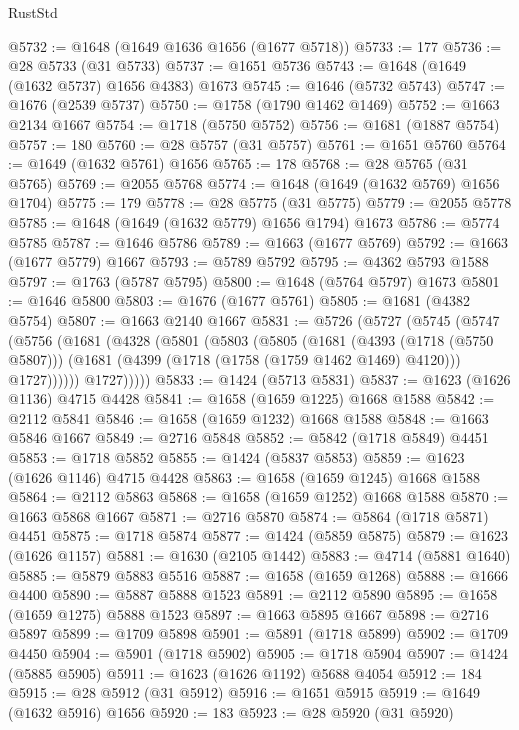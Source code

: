 \begin{lexlean}{RustStd}
\begin{coremodule}
{\begin{coremodule}
{{{{{{{{{{{{{{{{{{{{{{{{{{{{{{{{{{{{{{{{{{{{@5732 := @1648 (@1649 @1636 @1656 (@1677 @5718))
@5733 := 177
@5736 := @28 @5733 (@31 @5733)
@5737 := @1651 @5736
@5743 := @1648 (@1649 (@1632 @5737) @1656 @4383) @1673
@5745 := @1646 (@5732 @5743)
@5747 := @1676 (@2539 @5737)
@5750 := @1758 (@1790 @1462 @1469)
@5752 := @1663 @2134 @1667
@5754 := @1718 (@5750 @5752)
@5756 := @1681 (@1887 @5754)
@5757 := 180
@5760 := @28 @5757 (@31 @5757)
@5761 := @1651 @5760
@5764 := @1649 (@1632 @5761) @1656
@5765 := 178
@5768 := @28 @5765 (@31 @5765)
@5769 := @2055 @5768
@5774 := @1648 (@1649 (@1632 @5769) @1656 @1704)
@5775 := 179
@5778 := @28 @5775 (@31 @5775)
@5779 := @2055 @5778
@5785 := @1648 (@1649 (@1632 @5779) @1656 @1794) @1673
@5786 := @5774 @5785
@5787 := @1646 @5786
@5789 := @1663 (@1677 @5769)
@5792 := @1663 (@1677 @5779) @1667
@5793 := @5789 @5792
@5795 := @4362 @5793 @1588
@5797 := @1763 (@5787 @5795)
@5800 := @1648 (@5764 @5797) @1673
@5801 := @1646 @5800
@5803 := @1676 (@1677 @5761)
@5805 := @1681 (@4382 @5754)
@5807 := @1663 @2140 @1667
@5831 := @5726
    (@5727
      (@5745
        (@5747
          (@5756
            (@1681
              (@4328
                (@5801
                  (@5803
                    (@5805
                      (@1681
                        (@4393 (@1718 (@5750 @5807)))
                        (@1681 (@4399 (@1718 (@1758 (@1759 @1462 @1469) @4120))) @1727))))))
              @1727)))))
@5833 := @1424 (@5713 @5831)
@5837 := @1623 (@1626 @1136) @4715 @4428
@5841 := @1658 (@1659 @1225) @1668 @1588
@5842 := @2112 @5841
@5846 := @1658 (@1659 @1232) @1668 @1588
@5848 := @1663 @5846 @1667
@5849 := @2716 @5848
@5852 := @5842 (@1718 @5849) @4451
@5853 := @1718 @5852
@5855 := @1424 (@5837 @5853)
@5859 := @1623 (@1626 @1146) @4715 @4428
@5863 := @1658 (@1659 @1245) @1668 @1588
@5864 := @2112 @5863
@5868 := @1658 (@1659 @1252) @1668 @1588
@5870 := @1663 @5868 @1667
@5871 := @2716 @5870
@5874 := @5864 (@1718 @5871) @4451
@5875 := @1718 @5874
@5877 := @1424 (@5859 @5875)
@5879 := @1623 (@1626 @1157)
@5881 := @1630 (@2105 @1442)
@5883 := @4714 (@5881 @1640)
@5885 := @5879 @5883 @5516
@5887 := @1658 (@1659 @1268)
@5888 := @1666 @4400
@5890 := @5887 @5888 @1523
@5891 := @2112 @5890
@5895 := @1658 (@1659 @1275) @5888 @1523
@5897 := @1663 @5895 @1667
@5898 := @2716 @5897
@5899 := @1709 @5898
@5901 := @5891 (@1718 @5899)
@5902 := @1709 @4450
@5904 := @5901 (@1718 @5902)
@5905 := @1718 @5904
@5907 := @1424 (@5885 @5905)
@5911 := @1623 (@1626 @1192) @5688 @4054
@5912 := 184
@5915 := @28 @5912 (@31 @5912)
@5916 := @1651 @5915
@5919 := @1649 (@1632 @5916) @1656
@5920 := 183
@5923 := @28 @5920 (@31 @5920)
}}}}}}}}}}}}}}}}}}}}}}}}}}}}}}}}}}}}}}}}}}}}
\end{coremodule}}
\end{coremodule}
\end{lexlean}
